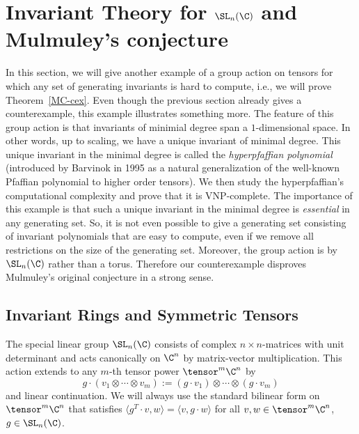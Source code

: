 \section{Invariant Theory for \texorpdfstring{$\SL_n(\C)$}{SL\_n(C)} and Mulmuley's conjecture} \label{Sec:Ketan}

%

In this section, we will give another example of a group action on tensors for which any set of generating invariants is hard to compute, i.e., we will prove Theorem~\ref{MC-cex}. Even though the previous section already gives a counterexample, this example illustrates something more. The feature of this group action is that invariants of minimial degree span a $1$-dimensional space. In other words, up to scaling, we have a unique invariant of minimal degree. This unique invariant in the minimal degree is called the \emph{hyperpfaffian polynomial} (introduced by Barvinok in 1995 as a natural generalization of the well-known Pfaffian polynomial to higher order tensors). We then study the hyperpfaffian's computational complexity and prove that it is VNP-complete. The importance of this example is that such a unique invariant in the minimal degree is {\em essential} in any generating set. So, it is not even possible to give a generating set consisting of invariant polynomials that are easy to compute, even if we remove all restrictions on the size of the generating set.
Moreover, the group action is by $\SL_n(\C)$ rather than a torus.
Therefore our counterexample disproves Mulmuley's original conjecture in a strong sense.
%

%
%
%


%
\subsection{Invariant Rings and Symmetric Tensors}\label{sec:invariants}
%
The special linear group $\SL_n(\C)$ consists of complex $n\times n$-matrices with unit determinant and acts canonically on $\C^n$ by matrix-vector multiplication.
This action extends to any $m$-th tensor power $\tensor^m \C^n$ by
\begin{equation}\label{eq:SL on tensor power}
g \cdot (v_1 \otimes \cdots \otimes v_m) := (g \cdot v_1) \otimes \cdots \otimes (g \cdot v_m)
\end{equation}
and linear continuation.
We will always use the standard bilinear form on $\tensor^m \C^n$ that satisfies $\langle g^T \cdot v, w\rangle = \langle v, g \cdot w \rangle$ for all $v,w \in \tensor^m\C^n$, $g \in \SL_n(\C)$.
%

